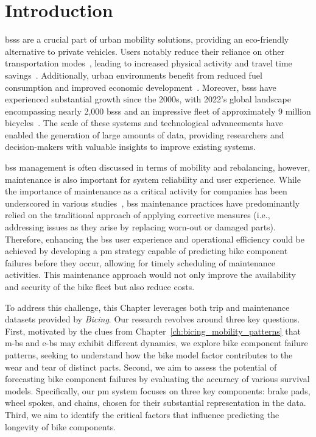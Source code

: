 \section{Introduction}

\acp{bss} are a crucial part of urban mobility solutions, providing an eco-friendly alternative to private vehicles. Users notably reduce their reliance on other transportation modes~\cite{Ma2020}, leading to increased physical activity and travel time savings~\cite{Qiu2018}. Additionally, urban environments benefit from reduced fuel consumption and improved economic development~\cite{Qiu2018}. Moreover, \acp{bss} have experienced substantial growth since the 2000s, with 2022's global landscape encompassing nearly 2,000 \acp{bss} and an impressive fleet of approximately 9 million bicycles~\cite{MeddinWorldMapReport2022}. The scale of these systems and technological advancements have enabled the generation of large amounts of data, providing researchers and decision-makers with valuable insights to improve existing systems.

\ac{bss} management is often discussed in terms of mobility and rebalancing, however, maintenance is also important for system reliability and user experience. While the importance of maintenance as a critical activity for companies has been underscored in various studies~\cite{Cho1991, Reinertsen1996}, \ac{bss} maintenance practices have predominantly relied on the traditional approach of applying corrective measures (i.e., addressing issues as they arise by replacing worn-out or damaged parts). Therefore, enhancing the \ac{bss} user experience and operational efficiency could be achieved by developing a \ac{pm} strategy capable of predicting bike component failures before they occur, allowing for timely scheduling of maintenance activities. This maintenance approach would not only improve the availability and security of the bike fleet but also reduce costs.

To address this challenge, this Chapter leverages both trip and maintenance datasets provided by \textit{Bicing}. Our research revolves around three key questions. First, motivated by the clues from Chapter~\ref{ch:bicing_mobility_patterns} that \acp{m-b} and \acp{e-b} may exhibit different dynamics, we explore bike component failure patterns, seeking to understand how the bike model factor contributes to the wear and tear of distinct parts. Second, we aim to assess the potential of forecasting bike component failures by evaluating the accuracy of various survival models. Specifically, our \ac{pm} system focuses on three key components: brake pads, wheel spokes, and chains, chosen for their substantial representation in the data. Third, we aim to identify the critical factors that influence predicting the longevity of bike components.


